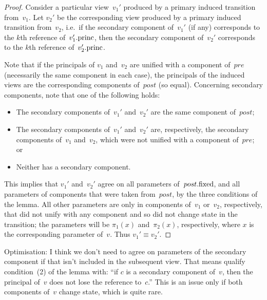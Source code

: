 \begin{proof}
Consider a particular view~$v_1'$ produced by a primary induced transition
from~$v_1$.  Let $v_2'$ be the corresponding view produced by a primary
induced transition from~$v_2$, i.e.~if the secondary component of~$v_1'$ (if
any) corresponds to the $k$th reference of~$v_1'.\mathrm{princ}$, then the secondary
component of~$v_2'$ corresponds to the $k$th reference of~$v_2'.\mathrm{princ}$.

Note that if the principals of $v_1$ and~$v_2$ are unified with a component
of~$pre$ (necessarily the same component in each case), the principals of the
induced views are the corresponding components of~$post$ (so equal).
Concerning secondary components, note that one of the following holds:
%
\begin{itemize}
\item The secondary components of~$v_1'$ and~$v_2'$ are the same component
  of~$post$; 

\item The secondary components of~$v_1'$ and~$v_2'$ are, respectively, the
  secondary components of~$v_1$ and~$v_2$, which were not unified with a
  component of~$pre$; or

\item Neither has a secondary component.
\end{itemize}

This implies that $v_1'$ and~$v_2'$ agree on all parameters of~$post.\mathrm{fixed}$,
and all parameters of components that were taken from~$post$, by the three
conditions of the lemma.  All other parameters are only in components of~$v_1$
or~$v_2$, respectively, that did not unify with any component and so did not
change state in the transition; the parameters will be $\pi_1(x)$
and~$\pi_2(x)$, respectively, where $x$ is the corresponding parameter of~$v$.
Thus $v_1' \equiv v_2'$.
\end{proof}

Optimisation: I think we don't need to agree on parameters of the secondary
component if that isn't included in the subsequent view.  That means qualify
condition~(2) of the lemma with: ``if $c$ is a secondary component of~$v$,
then the principal of~$v$ does not lose the reference to~$c$.''  This is an
issue only if both components of~$v$ change state, which is quite rare.



